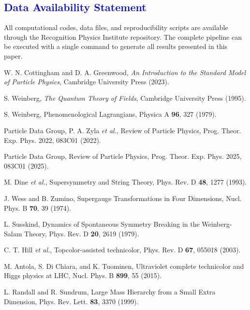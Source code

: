 \documentclass[%
amsmath,amssymb,
aps,
prb,
floatfix, showkeys, 10pt,
]{revtex4-2}
\newcommand{\modif}[1]{\textcolor{blue}{#1}}
\begin{document}
{\modif{  \section*{Data Availability Statement}  }}
All computational codes, data files, and reproducibility scripts are available through the Recognition Physics Institute repository. The complete pipeline can be executed with a single command to generate
all results presented in this paper.












\begin{thebibliography}{99}

W. N. Cottingham and D. A. Greenwood, 
\textit{An Introduction to the Standard Model of Particle Physics}, 
Cambridge University Press (2023).

S. Weinberg, 
\textit{The Quantum Theory of Fields}, 
Cambridge University Press (1995).

S. Weinberg, 
Phenomenological Lagrangians, 
Physica A \textbf{96}, 327 (1979).

Particle Data Group, P. A. Zyla \textit{et al.}, 
Review of Particle Physics, 
Prog. Theor. Exp. Phys. 2022, 083C01 (2022).

Particle Data Group, 
Review of Particle Physics, 
Prog. Theor. Exp. Phys. 2025, 083C01 (2025).

M. Dine \textit{et al.}, 
Supersymmetry and String Theory, 
Phys. Rev. D \textbf{48}, 1277 (1993).

J. Wess and B. Zumino, 
Supergauge Transformations in Four Dimensions, 
Nucl. Phys. B \textbf{70}, 39 (1974).

L. Susskind, 
Dynamics of Spontaneous Symmetry Breaking in the Weinberg-Salam Theory, 
Phys. Rev. D \textbf{20}, 2619 (1979).

C. T. Hill \textit{et al.}, 
Topcolor-assisted technicolor, 
Phys. Rev. D \textbf{67}, 055018 (2003).

M. Antola, S. Di Chiara, and K. Tuominen, 
Ultraviolet complete technicolor and Higgs physics at LHC, 
Nucl. Phys. B \textbf{899}, 55 (2015).

L. Randall and R. Sundrum, 
Large Mass Hierarchy from a Small Extra Dimension, 
Phys. Rev. Lett. \textbf{83}, 3370 (1999).


\end{thebibliography}
\end{document}
